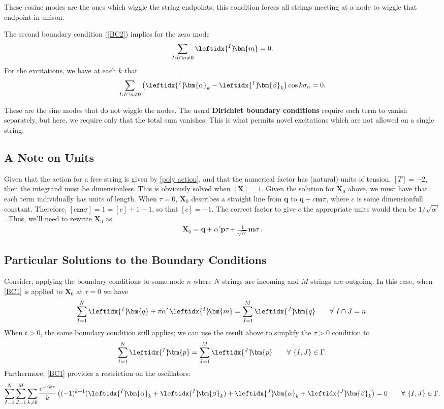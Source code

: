 \documentclass{article}
\newcommand{\be}{\begin{eqnarray}}
\newcommand{\ee}{\end{eqnarray}}
\def\X{\bm{X}}
\def\p{\bm{p}}
\def\q{\bm{q}}
\def\a{\bm{a}}
\def\m{\bm{m}}
\def\b{\bm{b}}
\def\lI{\leftidx{^I} \! }
\def\lJ{\leftidx{^J} \! }
\def\a{\bm{\alpha}}
\def\b{\bm{\beta}}
\begin{document}
These cosine modes are the ones which wiggle the string endpoints; this condition forces all strings meeting at a node to wiggle that endpoint in unison.

The second boundary condition (\ref{BC2}) implies for the zero mode
\be
\sum_{I : I \cap n \ne 0} \lI \m = 0 .
\ee
For the excitations, we have at each $k$ that
\be
\sum_{I : I \cap n \ne 0} \left( \lI \a_k - \lI \b_k \right)  \cos k \sigma_n = 0. 
\ee

These are the sine modes that do not wiggle the nodes. The usual \textbf{Dirichlet boundary conditions} require each term to vanish separately, but here, we require only that the total sum vanishes. This is what permits novel excitations which are not allowed on a single string.



\subsection{A Note on Units}

Given that the action for a free string is given by \eqref{poly action}, and that the numerical factor has (natural) units of tension, $[ T ] = -2$, then the integrand must be dimensionless. This is obviously solved when $[ \X ] = 1$. Given the solution for $\X_0$ above, we must have that each term individually has units of length. When $\tau = 0$, $\X_0$ describes a straight line from $\q$ to $\q + c \m \pi$, where $c$ is some dimensionfull constant. Therefore, $[ c \m \sigma ] = 1 = [ c ] + 1 + 1$, so that $[ c ] = -1$. The correct factor to give $c$ the appropriate units would then be $1/\sqrt{\alpha'}$. Thus, we'll need to rewrite $\X_0$ as
\be
\X_0 = \q + \alpha' \p \tau + \frac{1}{\sqrt{\alpha'}} \m \sigma \ .
\ee



\subsection{\textbf{Particular Solutions to the Boundary Conditions}}

Consider, applying the boundary conditions to some node $n$ where $N$ strings are incoming and $M$ strings are outgoing. In this case, when \eqref{BC1} is applied to $\X_0$ at $\tau = 0$ we have
\be
\sum^N_{I = 1} \lI \q + \pi \alpha' \, \lI \m = \sum^M_{J = 1}  \lJ \q \qquad \forall \ I \cap J = n .
\ee
When $t > 0$, the same boundary condition still applies; we can use the result above to simplify the $\tau > 0$ condition to
\be
\sum^N_{I = 1} \lI \p = \sum^M_{J=1} \lJ \p \qquad \forall \ \{I,J\} \in \Gamma .
\ee
Furthermore, \eqref{BC1} provides a restriction on the oscillators:
\be
\sum^N_{I=1} \sum^M_{J=1} \sum_{k \neq 0} \frac{e^{-ik \tau}}{k} \left( (-1)^{k+1} ( \lI \a_k + \lI \b_k) + \lJ \a_k + \lJ \b_k \right) = 0 \qquad \forall \ \{I,J\} \in \Gamma .
\ee
\end{document}
